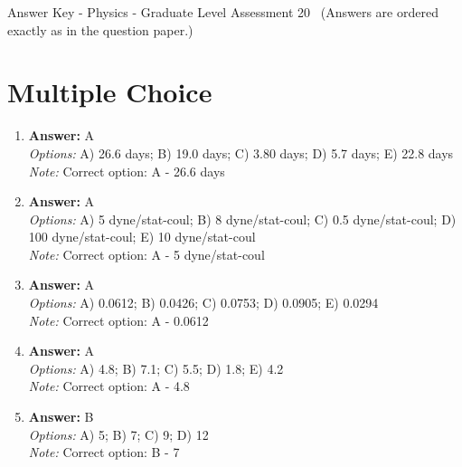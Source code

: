 \documentclass[12pt]{article}
\begin{document}
\begin{center}
Answer Key - Physics - Graduate Level Assessment 20 \
\small (Answers are ordered exactly as in the question paper.)
\end{center}

\section*{Multiple Choice}
\begin{enumerate}[label=\arabic*.]
\item \textbf{Answer:} A
\\ \textit{Options:} A) 26.6 days; B) 19.0 days; C) 3.80 days; D) 5.7 days; E) 22.8 days
\\ \textit{Note:} Correct option: A - 26.6 days
\item \textbf{Answer:} A
\\ \textit{Options:} A) 5 dyne/stat-coul; B) 8 dyne/stat-coul; C) 0.5 dyne/stat-coul; D) 100 dyne/stat-coul; E) 10 dyne/stat-coul
\\ \textit{Note:} Correct option: A - 5 dyne/stat-coul
\item \textbf{Answer:} A
\\ \textit{Options:} A) 0.0612; B) 0.0426; C) 0.0753; D) 0.0905; E) 0.0294
\\ \textit{Note:} Correct option: A - 0.0612
\item \textbf{Answer:} A
\\ \textit{Options:} A) 4.8; B) 7.1; C) 5.5; D) 1.8; E) 4.2
\\ \textit{Note:} Correct option: A - 4.8
\item \textbf{Answer:} B
\\ \textit{Options:} A) 5; B) 7; C) 9; D) 12
\\ \textit{Note:} Correct option: B - 7
\end{enumerate}
\end{document}
